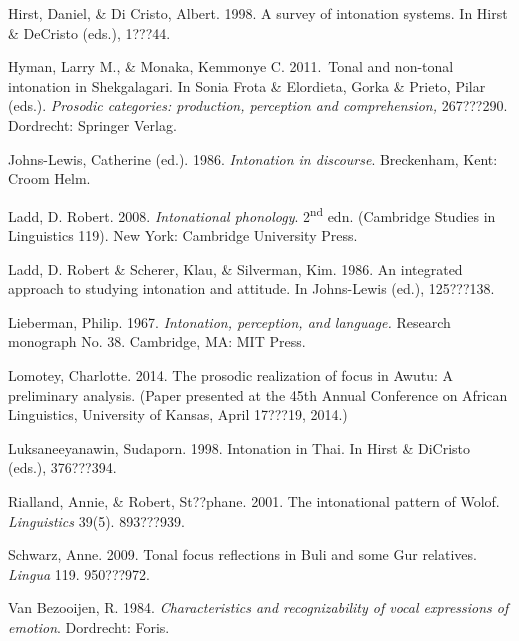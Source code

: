 \documentclass[output=paper]{langsci/langscibook}
\begin{document}
Hirst, Daniel, \& Di Cristo, Albert. 1998. A survey of intonation systems. In Hirst \& DeCristo (eds.), 1???44.



Hyman, Larry M., \& Monaka, Kemmonye C. 2011.~Tonal and non-tonal intonation in Shekgalagari. In Sonia Frota \& Elordieta, Gorka \& Prieto, Pilar (eds.). \emph{Prosodic categories: production, perception and comprehension,} 267???290. Dordrecht: Springer Verlag.



Johns-Lewis, Catherine (ed.). 1986. \emph{Intonation in discourse}. Breckenham, Kent: Croom Helm.



Ladd, D. Robert. 2008. \emph{Intonational phonology}. 2\textsuperscript{nd} edn. (Cambridge Studies in Linguistics 119). New York: Cambridge University Press.



Ladd, D. Robert \& Scherer, Klau, \& Silverman, Kim. 1986. An integrated approach to studying intonation and attitude. In Johns-Lewis (ed.),  125???138.



Lieberman, Philip. 1967. \textit{Intonation, perception, and language. }Research monograph No. 38.\textit{ } Cambridge, MA: MIT Press.



Lomotey, Charlotte.  2014. The prosodic realization of focus in Awutu: A preliminary analysis. (Paper presented at the 45th Annual Conference on African Linguistics, University of Kansas, April 17???19, 2014.)



Luksaneeyanawin, Sudaporn. 1998. Intonation in Thai. In Hirst \& DiCristo (eds.), 376???394.



Rialland, Annie, \& Robert, St??phane. 2001. The intonational pattern of Wolof. \textit{Linguistics} 39(5). 893???939.



Schwarz, Anne. 2009. Tonal focus reflections in Buli and some Gur relatives. \emph{Lingua} 119. 950???972.



Van Bezooijen, R. 1984. \emph{Characteristics and recognizability of vocal expressions of emotion}. Dordrecht: Foris.



 

{\sloppy
\printbibliography[heading=subbibliography,notkeyword=this]
}
\end{document}
